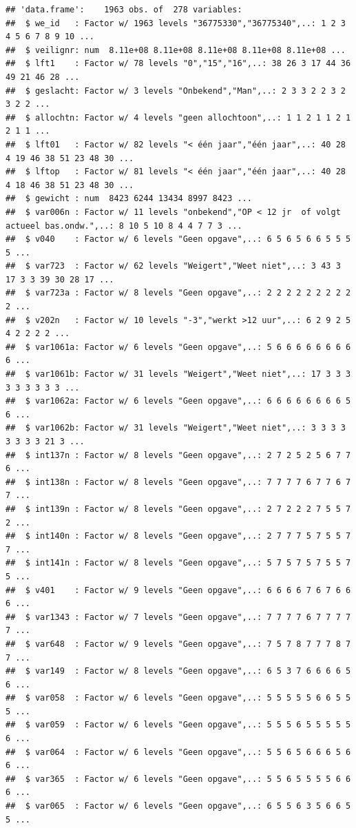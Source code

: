 \documentclass[
]{book}
\begin{document}
\begin{verbatim}
## 'data.frame':    1963 obs. of  278 variables:
##  $ we_id   : Factor w/ 1963 levels "36775330","36775340",..: 1 2 3 4 5 6 7 8 9 10 ...
##  $ veilignr: num  8.11e+08 8.11e+08 8.11e+08 8.11e+08 8.11e+08 ...
##  $ lft1    : Factor w/ 78 levels "0","15","16",..: 38 26 3 17 44 36 49 21 46 28 ...
##  $ geslacht: Factor w/ 3 levels "Onbekend","Man",..: 2 3 3 2 2 3 2 3 2 2 ...
##  $ allochtn: Factor w/ 4 levels "geen allochtoon",..: 1 1 2 1 1 2 1 2 1 1 ...
##  $ lft01   : Factor w/ 82 levels "< één jaar","één jaar",..: 40 28 4 19 46 38 51 23 48 30 ...
##  $ lftop   : Factor w/ 81 levels "< één jaar","één jaar",..: 40 28 4 18 46 38 51 23 48 30 ...
##  $ gewicht : num  8423 6244 13434 8997 8423 ...
##  $ var006n : Factor w/ 11 levels "onbekend","OP < 12 jr  of volgt actueel bas.ondw.",..: 8 10 5 10 8 4 4 7 7 3 ...
##  $ v040    : Factor w/ 6 levels "Geen opgave",..: 6 5 6 5 6 6 5 5 5 5 ...
##  $ var723  : Factor w/ 62 levels "Weigert","Weet niet",..: 3 43 3 17 3 3 39 30 28 17 ...
##  $ var723a : Factor w/ 8 levels "Geen opgave",..: 2 2 2 2 2 2 2 2 2 2 ...
##  $ v202n   : Factor w/ 10 levels "-3","werkt >12 uur",..: 6 2 9 2 5 4 2 2 2 2 ...
##  $ var1061a: Factor w/ 6 levels "Geen opgave",..: 5 6 6 6 6 6 6 6 6 6 ...
##  $ var1061b: Factor w/ 31 levels "Weigert","Weet niet",..: 17 3 3 3 3 3 3 3 3 3 ...
##  $ var1062a: Factor w/ 6 levels "Geen opgave",..: 6 6 6 6 6 6 6 6 5 6 ...
##  $ var1062b: Factor w/ 31 levels "Weigert","Weet niet",..: 3 3 3 3 3 3 3 3 21 3 ...
##  $ int137n : Factor w/ 8 levels "Geen opgave",..: 2 7 2 5 2 5 6 7 7 6 ...
##  $ int138n : Factor w/ 8 levels "Geen opgave",..: 7 7 7 7 6 7 7 6 7 7 ...
##  $ int139n : Factor w/ 8 levels "Geen opgave",..: 2 7 2 2 2 7 5 5 7 2 ...
##  $ int140n : Factor w/ 8 levels "Geen opgave",..: 2 7 7 7 5 7 5 5 7 7 ...
##  $ int141n : Factor w/ 8 levels "Geen opgave",..: 5 7 5 7 5 7 5 5 7 5 ...
##  $ v401    : Factor w/ 9 levels "Geen opgave",..: 6 6 6 6 7 6 7 6 6 6 ...
##  $ var1343 : Factor w/ 7 levels "Geen opgave",..: 7 7 7 7 6 7 7 7 7 7 ...
##  $ var648  : Factor w/ 9 levels "Geen opgave",..: 7 5 7 8 7 7 7 8 7 7 ...
##  $ var149  : Factor w/ 8 levels "Geen opgave",..: 6 5 3 7 6 6 6 6 5 6 ...
##  $ var058  : Factor w/ 6 levels "Geen opgave",..: 5 5 5 5 5 6 6 5 5 5 ...
##  $ var059  : Factor w/ 6 levels "Geen opgave",..: 5 5 5 6 5 5 5 5 5 6 ...
##  $ var064  : Factor w/ 6 levels "Geen opgave",..: 5 5 6 5 6 6 6 5 6 6 ...
##  $ var365  : Factor w/ 6 levels "Geen opgave",..: 5 5 6 5 5 5 5 6 6 6 ...
##  $ var065  : Factor w/ 6 levels "Geen opgave",..: 6 5 5 6 3 5 6 6 5 5 ...

\end{verbatim}
\end{document}
